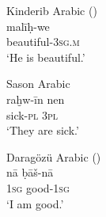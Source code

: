 \documentclass[output=paper]{langsci/langscibook}
\begin{document}
\begin{exe}
\ex \label{copt} 
		\begin{xlist}
		\ex Kinderib Arabic (\citealt[131]{Jastrow1978}) \\\label{copkr}\gll malī\d{h}-we		\\
    beautiful-\textsc{3sg.m} \\
       \glt `He is beautiful.'

	\ex Sason Arabic \\
	\label{copts} \gll raḫw-īn nen\\
	sick-\textsc{pl} \textsc{3pl}\\		
        \glt  `They are sick.'
	
		\ex Daragözü Arabic (\citealt[40]{Jastrow1973})\\ \label{coparam} \gll  nā ḅāš-nā\\
		\textsc{1sg} good-\textsc{1sg}\\
      \glt  `I am good.'
        \end{xlist}
     
\end{exe}



			
	
			
\end{document}
